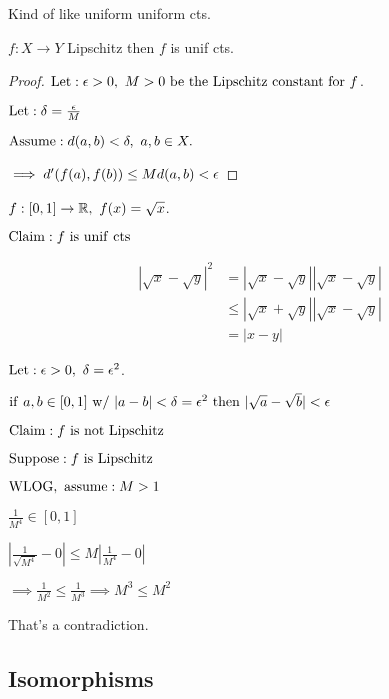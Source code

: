 \documentclass[12pt]{article}
\begin{document}
Kind of like uniform uniform cts.

\bboxprop
\begin{prop}
    \(f:X\to Y\) Lipschitz then \(f\) is unif cts.
\end{prop}
\ebox

\bboxproof
\begin{proof}
    \(\llet:\e>0,\ M>0\ \TR{be\ the\ Lipschitz\ constant\ for}\ f\).

    \(\mathrm{Let}:\delta=\frac{\epsilon} M\)

    \(\mathrm{Assume}:d(a,b)<\delta,\ a,b\in X.\)

    \(\implies d'(f(a),f(b))\le Md(a,b)<\epsilon\)
\end{proof}
\ebox

\bboxexam
\begin{exam}
    \(f:[0,1]\to\mathbb R,\ f(x)=\sqrt x\).

    \(\TR{Claim}:f\ \is\ \TR{unif\ cts}\)
    \bboxnote
    \begin{note}
        \begin{align*}
            |\sqrt x - \sqrt y|^2 &= |\sqrt x - \sqrt y||\sqrt x - \sqrt y|\\
                                  &\le|\sqrt x+\sqrt y||\sqrt x-\sqrt y|\\
                                  &=|x-y|
        \end{align*}
    \end{note}
    \ebox
    \(\mathrm{Let}:\epsilon>0,\ \delta=\epsilon^2\).

    \(\iif\ a,b\in[0,1]\ \TR{w/}\ 
    |a-b|<\delta=\epsilon^2\
    \tthen\ |\sqrt a-\sqrt b|<\e\)
\end{exam}
\ebox

\bboxexam
\begin{exam}
    \(\TR{Claim}:f\ \is\ \TR{not\ Lipschitz}\)

    \(\TR{Suppose}:f\ \is\ \TR{Lipschitz}\)

    \(\mathrm{WLOG,\ assume}:M>1\)

    \(\frac1{M^4}\in[0,1]\)

    \(\left|\frac1{\sqrt{M^4}}-0\right|\le M\left|\frac1{M^4}-0\right|\)

    \(\implies\frac1{M^2}\le\frac1{M^3}\implies M^3\le M^2\)

    That's a contradiction.
\end{exam}
\ebox

\subsection{Isomorphisms}
\end{document}
